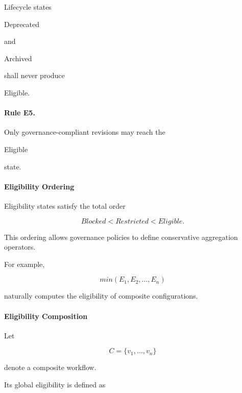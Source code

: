 \documentclass[10pt]{article}
\begin{document}
Lifecycle states

Deprecated

and

Archived

shall never produce

Eligible.


\paragraph{Rule E5.}

Only governance-compliant revisions may reach the

Eligible

state.

\paragraph{Eligibility Ordering}

Eligibility states satisfy the total order

\begin{equation}
Blocked
<
Restricted
<
Eligible.
\label{eq:app_elig1}
\end{equation}

This ordering allows governance policies to define conservative aggregation
operators.

For example,

\begin{equation}
min(E_1,E_2,\ldots,E_n)
\label{eq:app_elig2}
\end{equation}

naturally computes the eligibility of composite configurations.

\paragraph{Eligibility Composition}

Let

\begin{equation}
C
=
\{
v_1,
...
,
v_n
\}
\label{eq:app_elig3}
\end{equation}

denote a composite workflow.

Its global eligibility is defined as
\end{document}
